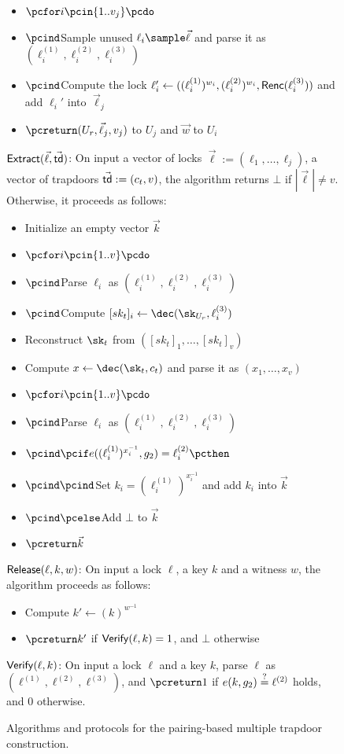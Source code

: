 \begin{figure*}[htb]
\begin{center}
{\begin{minipage}[t]{0.75\textwidth}
\begin{itemize}[label=-]
				\item $\pcfor i \pcin \{1..v_j\} \pcdo$
				\item $\pcind$Sample unused $\ell_i \sample \vec{\ell}$ and parse it as 
				$(\ell_i^{(1)},\ell_i^{(2)},\ell_i^{(3)})$
				\item $\pcind$Compute the lock $\ell_i' \gets((\ell_i^{(1)})^{w_i},
				(\ell_i^{(2)})^{w_i},\mathsf{Renc}(\ell_i^{(3)}))$ and add $\ell_i'$ into $\vec{\ell}_j$
				\item $\pcreturn (U_r,\vec{\ell}_j,v_j)$ to $U_j$ and $\vec{w}$ to $U_i$
			\end{itemize}
			\underline{$\mathsf{Extract}(\vec{\ell}, \vec{\mathsf{td}})$}: On input a vector of locks 
			$\vec{\ell} := (\ell_1,\ldots,\ell_j)$, a vector of trapdoors $\vec{\mathsf{td}} := (c_t,v)$, 
			the algorithm returns $\bot$ if $|\vec{\ell}| \neq v$. Otherwise, it proceeds as 
			follows:
			\begin{itemize}[label=-]
				\item Initialize an empty vector $\vec{k}$
				\item $\pcfor i \pcin \{1..v\} \pcdo$
				\item $\pcind$Parse $\ell_i$ as $(\ell_i^{(1)},\ell_i^{(2)},\ell_i^{(3)})$
				\item $\pcind$Compute $[sk_t]_i \gets \dec(\sk_{U_r},\ell_i^{(3)})$
				\item Reconstruct $\sk_t$ from $([sk_t]_1,\ldots,[sk_t]_v)$
				\item Compute $x \gets \dec(\sk_t,c_t)$ and parse it as $(x_1,\ldots,x_v)$
				\item $\pcfor i \pcin \{1..v\} \pcdo$
				\item $\pcind$Parse $\ell_i$ as $(\ell_i^{(1)},\ell_i^{(2)},\ell_i^{(3)})$
				\item $\pcind \pcif e((\ell_i^{(1)})^{x_i^{-1}}, g_2) = \ell_i^{(2)} \pcthen$
				\item $\pcind \pcind$Set $k_i = (\ell_i^{(1)})^{x_i^{-1}}$ and add $k_i$ into 
				$\vec{k}$
				\item $\pcind \pcelse$Add $\bot$ to $\vec{k}$
				\item $\pcreturn \vec{k}$
			\end{itemize}
			\underline{$\mathsf{Release}(\ell, k, w)$}: On input a lock $\ell$, a key $k$ and 
			a witness $w$, the algorithm proceeds as follows:
			\begin{itemize}[label=-]
				\item Compute $k' \gets (k)^{w^{-1}}$
				\item $\pcreturn k'$ if $\mathsf{Verify}(\ell, k) = 1$, and $\bot$ otherwise
			\end{itemize}
			\underline{$\mathsf{Verify}(\ell, k)$}: On input a lock $\ell$ and a key $k$, 
			parse $\ell$ as $(\ell^{(1)},\ell^{(2)}, \ell^{(3)})$, and $\pcreturn 1$ if $e(k, g_2) \stackrel{?}{=} 
			\ell^{(2)}$ holds, and 0 otherwise.
		\end{minipage}
	}
	\end{center}
	
	\caption{Algorithms and protocols for the pairing-based multiple trapdoor construction.}
	\label{fig:single-trapdoor}
\end{figure*}


